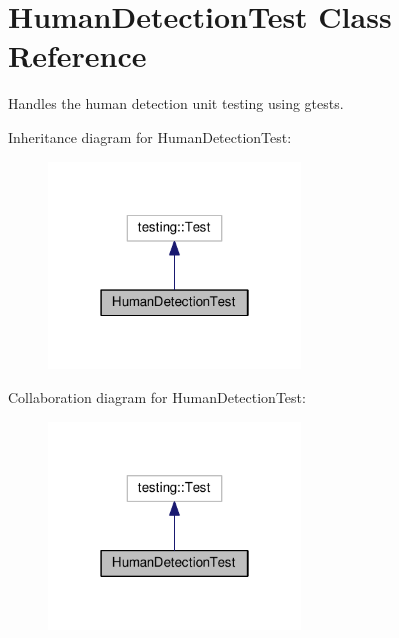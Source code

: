 \hypertarget{classHumanDetectionTest}{\section{Human\-Detection\-Test Class Reference}
\label{classHumanDetectionTest}
}


Handles the human detection unit testing using gtests.  




Inheritance diagram for Human\-Detection\-Test\-:
\nopagebreak
\begin{figure}[H]
\begin{center}
\leavevmode
\includegraphics[width=190pt]{classHumanDetectionTest__inherit__graph}
\end{center}
\end{figure}


Collaboration diagram for Human\-Detection\-Test\-:
\nopagebreak
\begin{figure}[H]
\begin{center}
\leavevmode
\includegraphics[width=190pt]{classHumanDetectionTest__coll__graph}
\end{center}
\end{figure}
